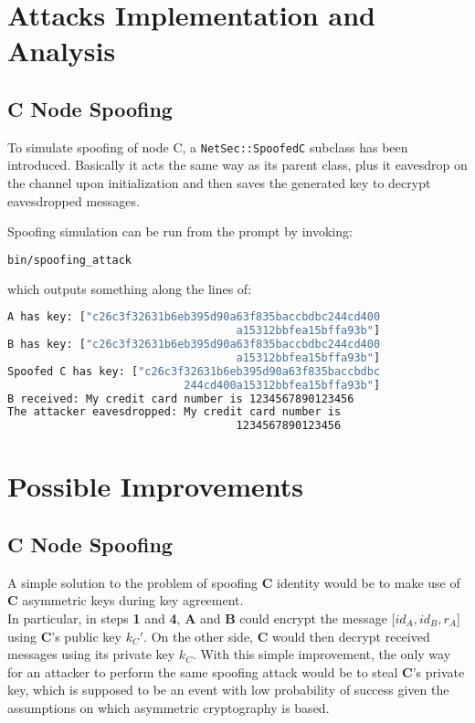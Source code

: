 \documentclass[a4paper,12pt,titlepage]{article}
\begin{document}
\section{Attacks Implementation and Analysis}
\subsection*{C Node Spoofing}
To simulate spoofing of node C, a \texttt{NetSec::SpoofedC} subclass has been
introduced. Basically it acts the same way as its parent class, plus it
eavesdrop on the channel upon initialization and then saves the generated key
to decrypt eavesdropped messages.

Spoofing simulation can be run from the prompt by invoking:

\begin{lstlisting}[language=bash]
bin/spoofing_attack
\end{lstlisting}

which outputs something along the lines of:

\begin{lstlisting}[language=bash]
A has key: ["c26c3f32631b6eb395d90a63f835baccbdbc244cd400
                                   a15312bbfea15bffa93b"]
B has key: ["c26c3f32631b6eb395d90a63f835baccbdbc244cd400
                                   a15312bbfea15bffa93b"]
Spoofed C has key: ["c26c3f32631b6eb395d90a63f835baccbdbc
                           244cd400a15312bbfea15bffa93b"]
B received: My credit card number is 1234567890123456
The attacker eavesdropped: My credit card number is 
                                   1234567890123456
\end{lstlisting}

\section{Possible Improvements}
\subsection*{C Node Spoofing}
A simple solution to the problem of spoofing \textbf{C} identity would be to make
use of \textbf{C} asymmetric keys during key agreement. \\
In particular, in steps \textbf{1} and \textbf{4}, \textbf{A} and \textbf{B} could encrypt the
message $[id_A, id_B, r_A$] using \textbf{C}'s public key
$k_C'$. On the other side, \textbf{C} would then decrypt received messages
using its private key $k_C$. With this simple improvement, the only
way for an attacker to perform the same spoofing attack would be to steal
\textbf{C}'s private key, which is supposed to be an event with low probability of
success given the assumptions on which  asymmetric cryptography is based.
\end{document}

